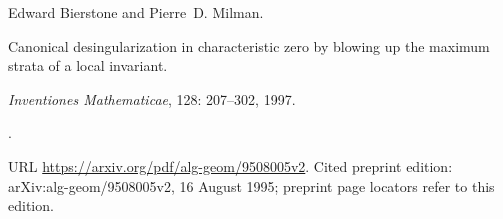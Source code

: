 Edward Bierstone and Pierre~D. Milman.

\newblock Canonical desingularization in characteristic zero by blowing up the
  maximum strata of a local invariant.

\newblock \emph{Inventiones Mathematicae}, 128: 207--302, 1997.

\newblock {}.

\newblock URL \url{https://arxiv.org/pdf/alg-geom/9508005v2}.
\newblock Cited preprint edition: arXiv:alg-geom/9508005v2,
16 August 1995; preprint page locators refer to this edition.

